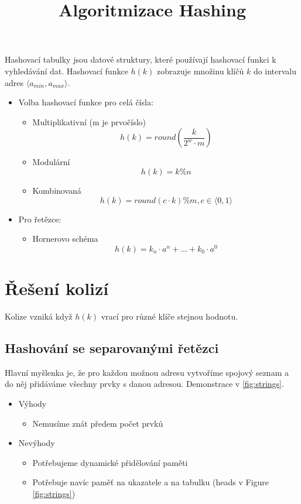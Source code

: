 \documentclass{book}
\begin{document}
\title{Algoritmizace Hashing}
\maketitle
Hashovací tabulky jsou datové struktury, které používají hashovací funkci k vyhledávání dat. Hashovací funkce $h(k)$ zobrazuje množinu klíčů $k$ do intervalu adres $\langle a_{min}, a_{max}\rangle$.

\begin{itemize}
\item Volba hashovací funkce pro celá čísla:
\begin{itemize}
\item Multiplikativní (m je prvočíslo)
\begin{equation}
h(k) = round(\frac{k}{2^w\cdot m})
\end{equation}
\item Modulární
\begin{equation}
h(k) = k \% n
\end{equation}
\item Kombinovaná
\begin{equation}
h(k) = round(c\cdot k)\% m, c \in \langle 0, 1 \rangle 
\end{equation}
\end{itemize}
\item Pro řetězce: 
\begin{itemize}
\item Hornerovo schéma
\begin{equation}
h(k) = k_n \cdot a^n + ... + k_0 \cdot a^0
\end{equation}
\end{itemize}
\end{itemize}

\section{Řešení kolizí}

Kolize vzniká když $h(k)$ vrací pro různé klíče stejnou hodnotu.

\subsection{Hashování se separovanými řetězci}
Hlavní myšlenka je, že pro každou možnou adresu vytvoříme spojový seznam a do něj přidáváme všechny prvky s danou adresou. Demonstrace v \ref{fig:strings}.

\begin{itemize}
\item{Výhody}
\begin{itemize}
\item Nemusíme znát předem počet prvků
\end{itemize}
\item Nevýhody
\begin{itemize}
\item Potřebujeme dynamické přidělování paměti
\item Potřebuje navíc paměť na ukazatele a na tabulku (heads v Figure \ref{fig:strings})
\end{itemize}
\end{itemize}
\end{document}
